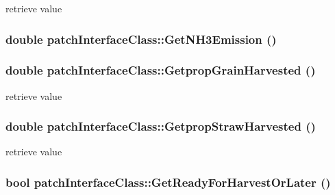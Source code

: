 retrieve value \hypertarget{classpatch_interface_class_a7c3316485cc5ee1ec04c3e5f89c6792c}{
\subsubsection[{GetNH3Emission}]{\setlength{\rightskip}{0pt plus 5cm}double patchInterfaceClass::GetNH3Emission ()}}
\label{classpatch_interface_class_a7c3316485cc5ee1ec04c3e5f89c6792c}
\hypertarget{classpatch_interface_class_a209ae68a78f632e7724dc8aba7c30959}{
\subsubsection[{GetpropGrainHarvested}]{\setlength{\rightskip}{0pt plus 5cm}double patchInterfaceClass::GetpropGrainHarvested ()}}
\label{classpatch_interface_class_a209ae68a78f632e7724dc8aba7c30959}


retrieve value \hypertarget{classpatch_interface_class_ae34dc1ee39f2f8d66fc540fb17c01fe3}{
\subsubsection[{GetpropStrawHarvested}]{\setlength{\rightskip}{0pt plus 5cm}double patchInterfaceClass::GetpropStrawHarvested ()}}
\label{classpatch_interface_class_ae34dc1ee39f2f8d66fc540fb17c01fe3}


retrieve value \hypertarget{classpatch_interface_class_a57fdc5494b65c610a3d3a29f8b8cfb85}{
\subsubsection[{GetReadyForHarvestOrLater}]{\setlength{\rightskip}{0pt plus 5cm}bool patchInterfaceClass::GetReadyForHarvestOrLater ()}}
\label{classpatch_interface_class_a57fdc5494b65c610a3d3a29f8b8cfb85}


